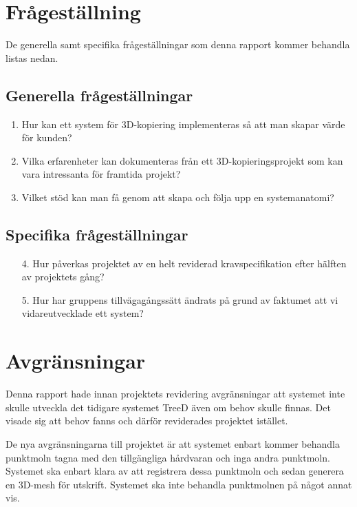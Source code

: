 \section{Frågeställning}
\label{sec:research-questions}
De generella samt specifika frågeställningar som denna rapport kommer behandla listas nedan.

\subsection{Generella frågeställningar}

\begin{enumerate}
	\item Hur kan ett system för 3D-kopiering implementeras så att man skapar värde för kunden?
	\item Vilka erfarenheter kan dokumenteras från ett 3D-kopieringsprojekt som kan vara intressanta för framtida projekt?
	\item Vilket stöd kan man få genom att skapa och följa upp en systemanatomi?
\end{enumerate}
	
\subsection{Specifika frågeställningar}

\begin{enumerate}
	\item [4.] Hur påverkas projektet av en helt reviderad kravspecifikation efter hälften av projektets gång?
	\item [5.] Hur har gruppens tillvägagångssätt ändrats på grund av faktumet att vi vidareutvecklade ett system? 
	
\end{enumerate}

\section{Avgränsningar}
\label{sec:delimitations}
Denna rapport hade innan projektets revidering avgränsningar att systemet inte skulle utveckla det tidigare systemet TreeD även om behov skulle finnas. Det visade sig att behov fanns och därför reviderades projektet istället.

De nya avgränsningarna till projektet är att systemet enbart kommer behandla punktmoln tagna med den tillgängliga hårdvaran och inga andra punktmoln. Systemet ska enbart klara av att registrera dessa punktmoln och sedan generera en 3D-mesh för utskrift. Systemet ska inte behandla punktmolnen på något annat vis.

